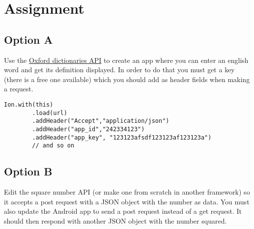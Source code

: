 \section{Assignment}


\subsection{Option A}
Use the \href{https://developer.oxforddictionaries.com}{Oxford dictionaries API} to create an app where you can enter an english word and get its definition displayed. In order to do that you must get a key (there is a free one available) which you should add as header fields when making a request.

\begin{lstlisting}[style=A_Java]
Ion.with(this)
        .load(url)
        .addHeader("Accept","application/json")
        .addHeader("app_id","242334123")
        .addHeader("app_key", "123123afsdf123123af123123a")
        // and so on
\end{lstlisting}

\subsection{Option B}
Edit the square number API (or make one from scratch in another framework) so it accepts a post request with a JSON object with the number as data. You must also update the Android app to send a post request instead of a get request. It should then respond with another JSON object with the number squared.

